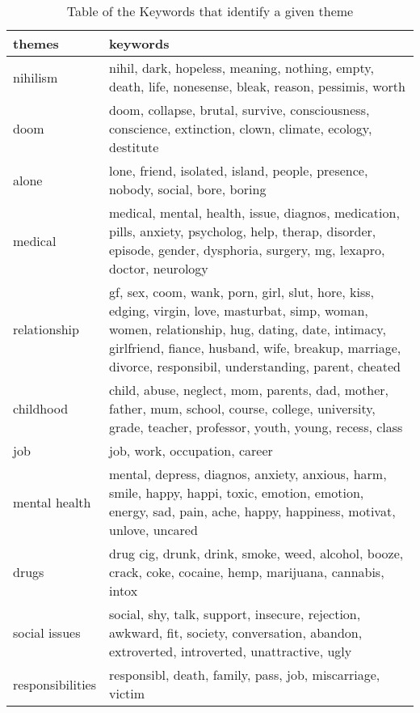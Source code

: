 \documentclass[../report.tex]{subfiles}
\begin{document}
\begin{table*}[ht]
        \centering
        \begin{tabular}{| l | l |}
        \toprule
                themes & keywords \\
        \midrule
   nihilism &  \multicolumn{1}{p{12cm}}{nihil, dark, hopeless, meaning, nothing, empty, death, life, nonesense, bleak, reason, pessimis, worth} \\
   doom & \multicolumn{1}{p{12cm}}{doom, collapse, brutal, survive, consciousness, conscience, extinction, clown, climate, ecology, destitute} \\
   alone & \multicolumn{1}{p{12cm}}{lone, friend, isolated, island, people, presence, nobody, social, bore, boring} \\
    medical & \multicolumn{1}{p{12cm}}{medical, mental, health, issue, diagnos, medication, pills, anxiety, psycholog, help, therap, disorder, episode, gender, dysphoria, surgery, mg, lexapro, doctor, neurology} \\
    relationship & \multicolumn{1}{p{12cm}}{gf, sex, coom, wank, porn, girl, slut, hore, kiss, edging, virgin, love, masturbat, simp, woman, women, relationship, hug, dating, date, intimacy, girlfriend, fiance, husband, wife, breakup, marriage, divorce, responsibil, understanding, parent, cheated} \\
   childhood & \multicolumn{1}{p{12cm}}{child, abuse, neglect, mom, parents, dad, mother, father, mum, school, course, college, university, grade, teacher, professor, youth, young, recess, class} \\
   job & \multicolumn{1}{p{12cm}}{job, work, occupation, career} \\
   mental health & \multicolumn{1}{p{12cm}}{mental, depress, diagnos, anxiety, anxious, harm, smile, happy, happi, toxic, emotion, emotion, energy, sad, pain, ache, happy, happiness, motivat, unlove, uncared} \\
   drugs & \multicolumn{1}{p{12cm}}{drug cig, drunk, drink, smoke, weed, alcohol, booze, crack, coke, cocaine, hemp, marijuana, cannabis, intox} \\
    social issues & \multicolumn{1}{p{12cm}}{social, shy, talk, support, insecure, rejection, awkward, fit, society, conversation, abandon, extroverted, introverted, unattractive, ugly} \\
    responsibilities & \multicolumn{1}{p{12cm}}{responsibl, death, family, pass, job, miscarriage, victim} \\
        \bottomrule
        \end{tabular}
        \caption{Table of the Keywords that identify a given theme}
        \label{tab:keywords}
\end{table*}
\end{document}
